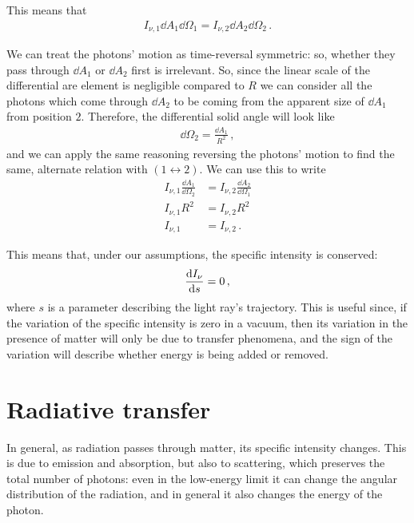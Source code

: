 \documentclass[main.tex]{subfiles}
\begin{document}
This means that 
%
\begin{align}
I_{\nu, 1} \dd{A_1 } \dd{\Omega_1 } = 
I_{\nu, 2} \dd{A_2 } \dd{\Omega_2 }
\,.
\end{align}
%

We can treat the photons' motion as time-reversal symmetric: so, whether they pass through \(\dd{A_1 }\) or \(\dd{A_2 }\) first is irrelevant. 
So, since the linear scale of the differential are element is negligible compared to \(R\) we can consider all the photons which come through \(\dd{A_2 }\) to be coming from the apparent size of \(\dd{A_1 }\) from position \(2\). 
Therefore, the differential solid angle will look like 
%
\begin{align}
\dd{\Omega_2 } = \frac{ \dd{A_1 } }{R^2}
\,,
\end{align}
%
and we can apply the same reasoning reversing the photons' motion to find the same, alternate relation with \((1 \leftrightarrow 2)\). 
We can use this to write 
%
\begin{subequations}
\begin{align}
I_{\nu , 1} \frac{ \dd{A_1 }}{ \dd{\Omega_2 }} &= 
I_{\nu , 2} \frac{ \dd{A_2 }}{ \dd{\Omega_1 }}  \\
I_{\nu ,1 } R^2 &= I_{\nu , 2} R^2  \\
I_{\nu , 1} &= I_{\nu , 2}
\,.
\end{align}
\end{subequations}

This means that, under our assumptions, the specific intensity is conserved: 
%
\begin{align}
\dv{I_{\nu }}{s} = 0
\,,
\end{align}
%
where \(s\) is a parameter describing the light ray's trajectory.
This is useful since, if the variation of the specific intensity is zero in a vacuum, then its variation in the presence of matter will only be due to transfer phenomena, and the sign of the variation will describe whether energy is being added or removed. 

\section{Radiative transfer}

In general, as radiation passes through matter, its specific intensity changes.
This is due to emission and absorption, but also to scattering, which preserves the total number of photons: even in the low-energy limit it can change the angular distribution of the radiation, and in general it also changes the energy of the photon.
\end{document}
